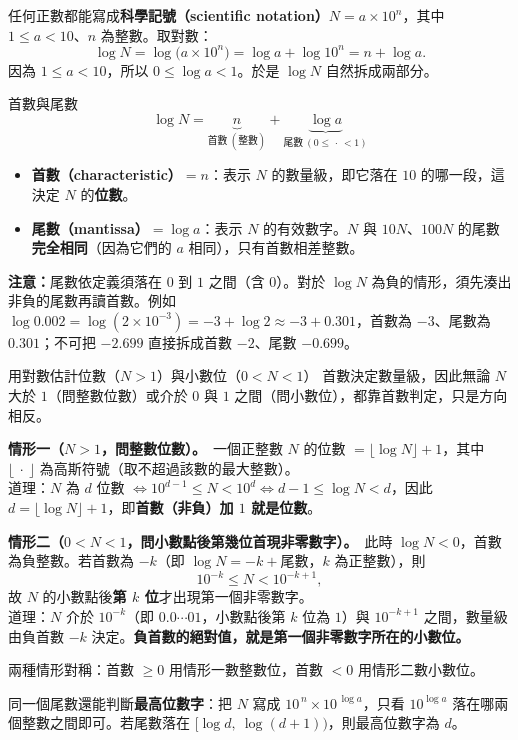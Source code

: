 \documentclass[11pt]{article}
\begin{document}
任何正數都能寫成\textbf{科學記號（scientific notation）}$N=a\times10^{n}$，其中 $1\le a<10$、$n$ 為整數。取對數：
$$\log N=\log\!\big(a\times10^{n}\big)=\log a+\log10^{n}=n+\log a.$$
因為 $1\le a<10$，所以 $0\le\log a<1$。於是 $\log N$ 自然拆成兩部分。

\begin{補充框}{首數與尾數}
$$\log N=\underbrace{n}_{\textbf{首數}\ (\text{整數})}+\underbrace{\log a}_{\textbf{尾數}\ (0\le\,\cdot\,<1)}$$
\begin{itemize}\setlength{\itemsep}{1pt}
\item \textbf{首數（characteristic）}$=n$：表示 $N$ 的數量級，即它落在 $10$ 的哪一段，這決定 $N$ 的\textbf{位數}。
\item \textbf{尾數（mantissa）}$=\log a$：表示 $N$ 的有效數字。$N$ 與 $10N$、$100N$ 的尾數\textbf{完全相同}（因為它們的 $a$ 相同），只有首數相差整數。
\end{itemize}

\textbf{注意：}尾數依定義須落在 $0$ 到 $1$ 之間（含 $0$）。對於 $\log N$ 為負的情形，須先湊出非負的尾數再讀首數。例如 $\log 0.002=\log(2\times10^{-3})=-3+\log 2\approx-3+0.301$，首數為 $-3$、尾數為 $0.301$；不可把 $-2.699$ 直接拆成首數 $-2$、尾數 $-0.699$。
\end{補充框}

\begin{補充框}{用對數估計位數（$N>1$）與小數位（$0<N<1$）}
首數決定數量級，因此無論 $N$ 大於 $1$（問整數位數）或介於 $0$ 與 $1$ 之間（問小數位），都靠首數判定，只是方向相反。

\textbf{情形一（$N>1$，問整數位數）。}\ 一個正整數 $N$ 的位數 $=\lfloor\log N\rfloor+1$，其中 $\lfloor\ \cdot\ \rfloor$ 為高斯符號（取不超過該數的最大整數）。\\
道理：$N$ 為 $d$ 位數 $\iff 10^{d-1}\le N<10^{d}\iff d-1\le\log N<d$，因此 $d=\lfloor\log N\rfloor+1$，即\textbf{首數（非負）加 $1$ 就是位數}。

\textbf{情形二（$0<N<1$，問小數點後第幾位首現非零數字）。}\ 此時 $\log N<0$，首數為負整數。若首數為 $-k$（即 $\log N=-k+\text{尾數}$，$k$ 為正整數），則
$$10^{-k}\le N<10^{-k+1},$$
故 $N$ 的小數點後\textbf{第 $k$ 位}才出現第一個非零數字。\\
道理：$N$ 介於 $10^{-k}$（即 $0.0\cdots01$，小數點後第 $k$ 位為 $1$）與 $10^{-k+1}$ 之間，數量級由負首數 $-k$ 決定。\textbf{負首數的絕對值，就是第一個非零數字所在的小數位。}

兩種情形對稱：首數 $\ge0$ 用情形一數整數位，首數 $<0$ 用情形二數小數位。

同一個尾數還能判斷\textbf{最高位數字}：把 $N$ 寫成 $10^{\,n}\times10^{\,\log a}$，只看 $10^{\log a}$ 落在哪兩個整數之間即可。若尾數落在 $[\log d,\ \log(d+1))$，則最高位數字為 $d$。
\end{補充框}
\end{document}
